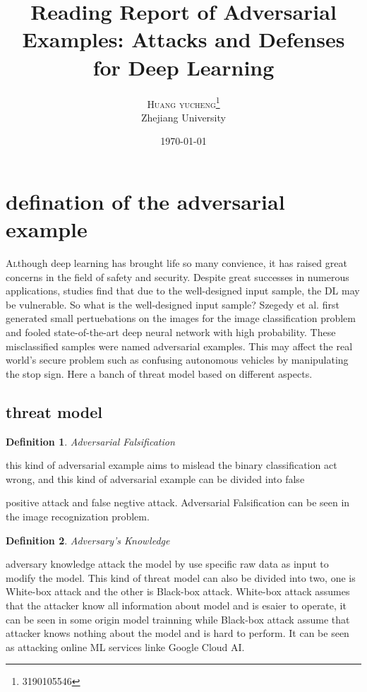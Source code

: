 \documentclass[twoside,twocolumn]{article}
\title{Reading Report of Adversarial Examples: Attacks and Defenses for Deep Learning} %
\author{%
\textsc{Huang yucheng}\thanks{3190105546} \\[1ex] %
\normalsize Zhejiang University \\ %
\normalsize \href{}{} %
}
\date{\today} %
\newtheorem{definition}{Definition}
\begin{document}
\maketitle


\section{defination of the adversarial example}

\lettrine[nindent=0em,lines=2]Although deep learning has brought life so many convience, it has raised great concerns in the field of safety and security. Despite great successes in numerous applications, studies find that due to the well-designed input sample, the DL may be vulnerable. 
So what is the well-designed input sample? Szegedy et al. first generated small pertuebations on the images for the image classification problem and fooled state-of-the-art deep neural network with high probability. These misclassified samples were named adversarial examples. This may affect the real world's secure problem such as confusing autonomous vehicles by manipulating the stop sign. Here a banch of threat model based on different aspects.
\subsection{threat model}
\begin{definition}
	Adversarial Falsification
\end{definition}
this kind of adversarial example aims to mislead the binary classification act wrong, and this kind of adversarial example can be divided into false 

positive attack and false negtive attack.
Adversarial Falsification can be seen in the image recognization problem.
\begin{definition}
	Adversary's Knowledge
\end{definition}
adversary knowledge attack the model by use specific raw data as input to modify the model. This kind of threat model can also be divided into two, one is White-box attack and the other is Black-box attack. White-box attack assumes that the attacker know all information about model and is esaier to operate, it can be seen in some origin model trainning while Black-box attack assume that attacker knows nothing about the model and is hard to perform. It can be seen as attacking online ML services linke Google Cloud AI.
\end{document}
